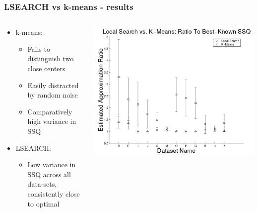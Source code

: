 \documentclass{beamer}
\begin{document}
\frame
{
  \frametitle{LSEARCH vs k-means - results}
  
  \begin{columns}
  
    \begin{column}{0.4\textwidth}
    	  \begin{itemize}
    	  	\item[]{k-means:
    	  	  \begin{itemize}
    	  	    \item{Fails to distinguish two close centers}
    	  	    \item{Easily distracted by random noise}
    	  	    \item{Comparatively high variance in SSQ}
    	  	  \end{itemize}
    	  	}
    	  	\item[]{LSEARCH:
    	  	  \begin{itemize}
    	  	    \item{Low variance in SSQ across all data-sets, consistently close to optimal}
    	  	  \end{itemize}
    	  	}
    	  \end{itemize}
    	  
    \end{column}
    
    \begin{column}{0.6\textwidth}
        \begin{center}
         \includegraphics[width=\textwidth]{figures/LSEARCH_vs_k-means.png}      
        \end{center}
    \end{column}
    
  \end{columns}  
}
\end{document}
